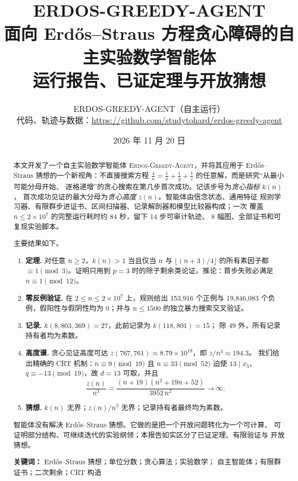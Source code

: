 \documentclass[11pt,a4paper]{ctexart}
\title{\bfseries ERDOS-GREEDY-AGENT\\[4pt]
\large 面向 Erdős--Straus 方程贪心障碍的自主实验数学智能体\\[2pt]
\normalsize 运行报告、已证定理与开放猜想}
\author{ERDOS-GREEDY-AGENT（自主运行）\\[2pt]
\small 代码、轨迹与数据：\url{https://github.com/studytohard/erdos-greedy-agent}}
\date{2026 年 11 月 20 日}
\theoremstyle{definition}
\theoremstyle{remark}
\begin{document}
\maketitle

\begin{abstract}
\noindent
本文开发了一个自主实验数学智能体 \textsc{Erdos-Greedy-Agent}，并将其应用于
Erdős--Straus 猜想的一个新视角：不直接搜索方程
$\frac4n=\frac1x+\frac1y+\frac1z$ 的任意解，而是研究“从最小可能分母开始、
逐格递增”的贪心搜索在第几步首次成功。记该步号为\emph{贪心指标} $k(n)$，
首次成功见证的最大分母为\emph{贪心高度} $z(n)$。智能体由信念状态、通用特征
规则学习器、有限群步进证书、区间扫描器、记录解剖器和模型比较器构成；一次
覆盖 $n\le 2\times 10^7$ 的完整运行耗时约 84 秒，留下 14 步可审计轨迹、
8 幅图、全部证书和可复现实验脚本。

主要结果如下。
\begin{enumerate}
\item \textbf{定理.} 对任意 $n\ge2$，$k(n)>1$ 当且仅当 $n$ 与
$\lfloor (n+3)/4\rfloor$ 的所有素因子都 $\equiv1\pmod3$。证明只用到 $p=3$
时的除子剩余类论证。推论：首步失败必满足 $n\equiv1\pmod{12}$。
\item \textbf{零反例验证.} 在 $2\le n\le2\times10^7$ 上，规则给出
153{,}916 个正例与 19{,}846{,}083 个负例，假阳性与假阴性均为 0；并与
$n\le1500$ 的独立暴力搜索交叉验证。
\item \textbf{记录.} $k(8{,}803{,}369)=27$，此前记录为 $k(118{,}801)=15$；
除 $49$ 外，所有记录持有者均为素数。
\item \textbf{高度谱.} 贪心见证高度可达
$z(767{,}761)\approx8.79\times10^{19}$，即 $z/n^3\approx194.3$。
我们给出精确的 CRT 机制：$n\equiv9\pmod{19}$ 且 $n\equiv33\pmod{52}$
迫使 $13\mid x_5$、$q\equiv-13\pmod{19}$，故 $d=13$ 可取，并且
\[
\frac{z(n)}{n^3}=\frac{(n+19)(n^2+19n+52)}{3952\,n^2}\longrightarrow\infty .
\]
\item \textbf{猜想.} $k(n)$ 无界；$z(n)/n^3$ 无界；记录持有者最终均为素数。
\end{enumerate}

智能体没有解决 Erdős--Straus 猜想。它做的是把一个开放问题转化为一个可计算、
可证明部分结构、可继续迭代的实验纲领；本报告如实区分了已证定理、有限验证与
开放猜想。

\vspace{0.6em}
\noindent\textbf{关键词：} Erdős--Straus 猜想；单位分数；贪心算法；实验数学；
自主智能体；有限群证书；二次剩余；CRT 构造
\end{abstract}
\end{document}

